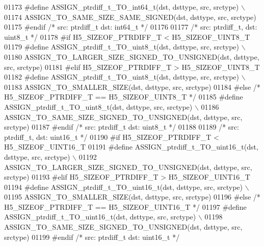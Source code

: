 \begin{DoxyCode}
01173 \textcolor{preprocessor}{    #define ASSIGN\_ptrdiff\_t\_TO\_int64\_t(dst, dsttype, src, srctype) \(\backslash\)}
01174 \textcolor{preprocessor}{        ASSIGN\_TO\_SAME\_SIZE\_SAME\_SIGNED(dst, dsttype, src, srctype)}
01175 \textcolor{preprocessor}{#endif }\textcolor{comment}{/* src: ptrdiff\_t dst: int64\_t */}\textcolor{preprocessor}{}
01176 
01177 \textcolor{comment}{/* src: ptrdiff\_t, dst: uint8\_t */}
01178 \textcolor{preprocessor}{#if H5\_SIZEOF\_PTRDIFF\_T < H5\_SIZEOF\_UINT8\_T}
01179 \textcolor{preprocessor}{    #define ASSIGN\_ptrdiff\_t\_TO\_uint8\_t(dst, dsttype, src, srctype) \(\backslash\)}
01180 \textcolor{preprocessor}{        ASSIGN\_TO\_LARGER\_SIZE\_SIGNED\_TO\_UNSIGNED(dst, dsttype, src, srctype)}
01181 \textcolor{preprocessor}{#elif H5\_SIZEOF\_PTRDIFF\_T > H5\_SIZEOF\_UINT8\_T}
01182 \textcolor{preprocessor}{    #define ASSIGN\_ptrdiff\_t\_TO\_uint8\_t(dst, dsttype, src, srctype) \(\backslash\)}
01183 \textcolor{preprocessor}{        ASSIGN\_TO\_SMALLER\_SIZE(dst, dsttype, src, srctype)}
01184 \textcolor{preprocessor}{#else }\textcolor{comment}{/* H5\_SIZEOF\_PTRDIFF\_T == H5\_SIZEOF\_UINT8\_T */}\textcolor{preprocessor}{}
01185 \textcolor{preprocessor}{    #define ASSIGN\_ptrdiff\_t\_TO\_uint8\_t(dst, dsttype, src, srctype) \(\backslash\)}
01186 \textcolor{preprocessor}{        ASSIGN\_TO\_SAME\_SIZE\_SIGNED\_TO\_UNSIGNED(dst, dsttype, src, srctype)}
01187 \textcolor{preprocessor}{#endif }\textcolor{comment}{/* src: ptrdiff\_t dst: uint8\_t */}\textcolor{preprocessor}{}
01188 
01189 \textcolor{comment}{/* src: ptrdiff\_t, dst: uint16\_t */}
01190 \textcolor{preprocessor}{#if H5\_SIZEOF\_PTRDIFF\_T < H5\_SIZEOF\_UINT16\_T}
01191 \textcolor{preprocessor}{    #define ASSIGN\_ptrdiff\_t\_TO\_uint16\_t(dst, dsttype, src, srctype) \(\backslash\)}
01192 \textcolor{preprocessor}{        ASSIGN\_TO\_LARGER\_SIZE\_SIGNED\_TO\_UNSIGNED(dst, dsttype, src, srctype)}
01193 \textcolor{preprocessor}{#elif H5\_SIZEOF\_PTRDIFF\_T > H5\_SIZEOF\_UINT16\_T}
01194 \textcolor{preprocessor}{    #define ASSIGN\_ptrdiff\_t\_TO\_uint16\_t(dst, dsttype, src, srctype) \(\backslash\)}
01195 \textcolor{preprocessor}{        ASSIGN\_TO\_SMALLER\_SIZE(dst, dsttype, src, srctype)}
01196 \textcolor{preprocessor}{#else }\textcolor{comment}{/* H5\_SIZEOF\_PTRDIFF\_T == H5\_SIZEOF\_UINT16\_T */}\textcolor{preprocessor}{}
01197 \textcolor{preprocessor}{    #define ASSIGN\_ptrdiff\_t\_TO\_uint16\_t(dst, dsttype, src, srctype) \(\backslash\)}
01198 \textcolor{preprocessor}{        ASSIGN\_TO\_SAME\_SIZE\_SIGNED\_TO\_UNSIGNED(dst, dsttype, src, srctype)}
01199 \textcolor{preprocessor}{#endif }\textcolor{comment}{/* src: ptrdiff\_t dst: uint16\_t */}\textcolor{preprocessor}{}

\end{DoxyCode}

